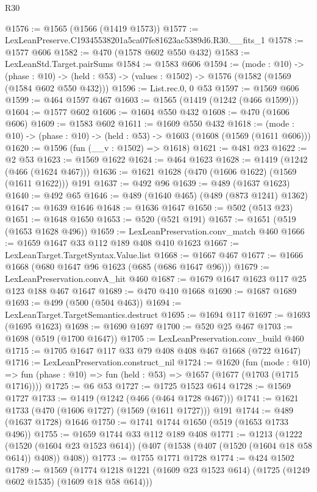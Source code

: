 \begin{lexlean}{R30}
\begin{coremodule}
@1576 := @1565 (@1566 (@1419 @1573))
@1577 := LexLeanPreserve.C19345538201a5ca07fe81623ac5389d6.R30.__fits_1
@1578 := @1577 @606
@1582 := @470 (@1578 @602 @550 @432)
@1583 := LexLeanStd.Target.pairSums
@1584 := @1583 @606
@1594 := (mode : @10) ->
  (phase : @10) -> (held : @53) -> (values : @1502) -> @1576 (@1582 (@1569 (@1584 @602 @550 @432)))
@1596 := List.rec.{0, 0} @53
@1597 := @1569 @606
@1599 := @464 @1597 @467
@1603 := @1565 (@1419 (@1242 (@466 @1599)))
@1604 := @1577 @602
@1606 := @1604 @550 @432
@1608 := @470 (@1606 @606)
@1609 := @1583 @602
@1611 := @1609 @550 @432
@1618 := (mode : @10) -> (phase : @10) -> (held : @53) -> @1603 (@1608 (@1569 (@1611 @606)))
@1620 := @1596 (fun (__v : @1502) => @1618)
@1621 := @481 @23
@1622 := @2 @53
@1623 := @1569 @1622
@1624 := @464 @1623
@1628 := @1419 (@1242 (@466 (@1624 @467)))
@1636 := @1621 @1628 (@470 (@1606 @1622) (@1569 (@1611 @1622))) @191
@1637 := @492 @96
@1639 := @489 (@1637 @1623)
@1640 := @492 @65
@1646 := @489 (@1640 @465) (@489 (@873 @1241) @1362)
@1647 := @1639 @1646
@1648 := @1636 @1647
@1650 := @502 (@513 @23)
@1651 := @1648 @1650
@1653 := @520 (@521 @191)
@1657 := @1651 (@519 (@1653 @1628 @496))
@1659 := LexLeanPreservation.conv_match @460
@1666 := @1659 @1647 @33 @112 @189 @408 @410 @1623
@1667 := LexLeanTarget.TargetSyntax.Value.list
@1668 := @1667 @467
@1677 := @1666 @1668 (@680 @1647 @96 @1623 (@685 (@686 @1647 @96)))
@1679 := LexLeanPreservation.convA_hit @460
@1687 := @1679 @1647 @1623 @117 @25 @123 @188 @467 @1647
@1689 := @470 @410 @1668
@1690 := @1687 @1689
@1693 := @499 (@500 (@504 @463))
@1694 := LexLeanTarget.TargetSemantics.destruct
@1695 := @1694 @117
@1697 := @1693 (@1695 @1623)
@1698 := @1690 @1697
@1700 := @520 @25 @467
@1703 := @1698 (@519 (@1700 @1647))
@1705 := LexLeanPreservation.conv_build @460
@1715 := @1705 @1647 @117 @33 @79 @408 @408 @467 @1668 (@722 @1647)
@1716 := LexLeanPreservation.construct_nil
@1724 := @1620
    (fun (mode : @10) =>
    fun (phase : @10) => fun (held : @53) => @1657 (@1677 (@1703 (@1715 @1716))))
@1725 := @6 @53
@1727 := @1725 @1523 @614
@1728 := @1569 @1727
@1733 := @1419 (@1242 (@466 (@464 @1728 @467)))
@1741 := @1621 @1733 (@470 (@1606 @1727) (@1569 (@1611 @1727))) @191
@1744 := @489 (@1637 @1728) @1646
@1750 := @1741 @1744 @1650 (@519 (@1653 @1733 @496))
@1755 := @1659 @1744 @33 @112 @189 @408
@1771 := @1213
    (@1222
      (@1520 (@1604 @23 @1523 @614))
      (@407 (@1538 (@407 (@1520 (@1604 @18 @58 @614)) @408)) @408))
@1773 := @1755 @1771 @1728
@1774 := @424 @1502
@1789 := @1569
    (@1774 @1218 @1221 (@1609 @23 @1523 @614) (@1725 (@1249 @602 @1535) (@1609 @18 @58 @614)))

\end{coremodule}
\end{lexlean}
